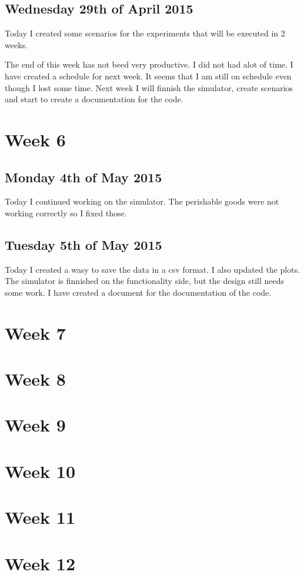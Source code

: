 \documentclass{article}
\begin{document}
\subsection{Wednesday 29th of April 2015}
Today I created some scenarios for the experiments that will be executed in 2 weeks.

The end of this week has not beed very productive. I did not had alot of time. I have created a schedule for next week. It seems that I am still on schedule even though I lost some time. Next week  I will finnish the simulator, create scenarios and start to create a documentation for the code.

\section{Week 6}

\subsection{Monday 4th of May 2015}
Today I continued working on the simulator. The perishable goods were not working correctly so I fixed those. 

\subsection{Tuesday 5th of May 2015}
Today I created a wasy to save the data in a csv format. I also updated the plots. The simulator is finnished on the functionality side, but the design still needs some work. I have created a document for the documentation of the code.
\subsection{}

\section{Week 7}


\section{Week 8}


\section{Week 9}


\section{Week 10}


\section{Week 11}


\section{Week 12}




\end{document}
